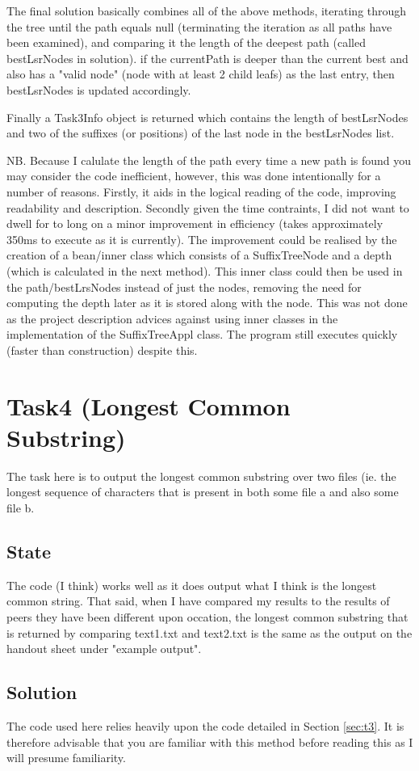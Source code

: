 \documentclass[12pt]{article} %
\begin{document}
The final solution basically combines all of the above methods, iterating through the tree until
the path equals null (terminating the iteration as all paths have been examined), and comparing it
the length of the deepest path (called bestLsrNodes in solution). if the currentPath is deeper than
the current best and also has a "valid node" (node with at least 2 child leafs) as the last entry,
then bestLsrNodes is updated accordingly.

Finally a Task3Info object is returned which contains the length of bestLsrNodes and two of the
suffixes (or positions) of the last node in the bestLsrNodes list.

NB. Because I calulate the length of the path every time a new path is found you may consider the
code inefficient, however, this was done intentionally for a number of reasons. Firstly, it aids in
the logical reading of the code, improving readability and description. Secondly given the time
contraints, I did not want to dwell for to long on a minor improvement in efficiency (takes
approximately 350ms to execute as it is currently). The improvement could be realised by the creation
of a bean/inner class which consists of a SuffixTreeNode and a depth (which is calculated in the next method).
This inner class could then be used in the path/bestLrsNodes instead of just the nodes, removing the need for
computing the depth later as it is stored along with the node. This was not done as the project description advices against using inner classes in the implementation of the SuffixTreeAppl class. The program still executes quickly (faster than construction) despite this.
\newpage
\section{Task4 (Longest Common Substring)}
The task here is to output the longest common substring over two files (ie. the longest sequence of
characters that is present in both some file a and also some file b.
\subsection{State}
The code (I think) works well as it does output what I think is the longest common string. That
said, when I have compared my results to the results of peers they have been different upon
occation, the longest common substring that is returned by comparing text1.txt and text2.txt is the same as the output on the handout sheet under "example output".
\subsection{Solution}
The code used here relies heavily upon the code detailed in Section \ref{sec:t3}.
It is therefore advisable that you are familiar with this method before reading this as I will
presume familiarity. 
\end{document}
